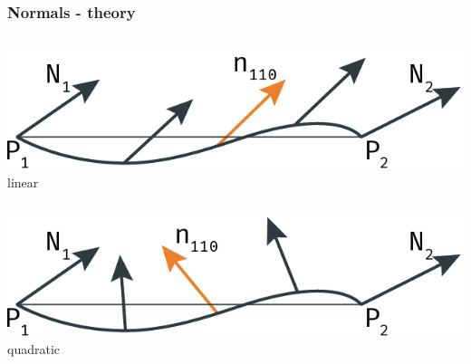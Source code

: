 	\begin{frame}\frametitle{Normals - theory}
		\begin{columns}
			\begin{column}{0.6\textwidth}
				\begin{center}
					\includegraphics[width=\textwidth]{img/1_single/linearVsQuadraticNormals_linear.png}
					\small{linear}
				\end{center}	
			\end{column}
		\end{columns}
		\pause
		\vspace{0.8cm}
		\begin{columns}
			\begin{column}{0.6\textwidth}
				\begin{center}
					\includegraphics[width=\textwidth]{img/1_single/linearVsQuadraticNormals_quadratic.png}
					\small{quadratic}
				\end{center}	
			\end{column}
		\end{columns}
	\end{frame}

